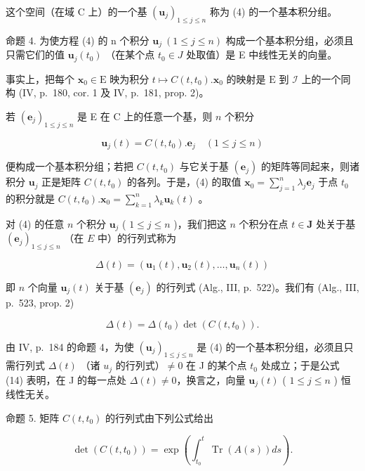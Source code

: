 这个空间（在域 C 上）的一个基 \((\mathbf{u}_{j})_{1\leqslant j\leqslant n}\) 称为 (4) 的一个基本积分组。

命题 4. 为使方程 (4) 的 n 个积分 \(\mathbf{u}_{j}\ (1 \leqslant j \leqslant n)\) 构成一个基本积分组，必须且只需它们的值 \(\mathbf{u}_{j}(t_{0})\) （在某个点 \(t_{0} \in J\) 处取值）是 E 中线性无关的向量。

事实上，把每个 \(\mathbf{x}_0 \in \mathrm{E}\) 映为积分 \(t \mapsto C(t, t_0). \mathbf{x}_0\) 的映射是 \(\mathrm{E}\) 到 \(\mathcal{I}\) 上的一个同构 (IV, p.~180, cor. 1 及 IV, p.~181, prop. 2)。

若 \(\left(\mathbf{e}_j\right)_{1\leqslant j\leqslant n}\) 是 E 在 C 上的任意一个基，则 \(n\) 个积分

\[
\mathbf {u} _ {j} (t) = C \left(t, t _ {0}\right). \mathbf {e} _ {j} \quad (1 \leqslant j \leqslant n)
\]

便构成一个基本积分组；若把 \(C(t, t_0)\) 与它关于基 \((\mathbf{e}_j)\) 的矩阵等同起来，则诸积分 \(\mathbf{u}_j\) 正是矩阵 \(C(t, t_0)\) 的各列。于是，(4) 的取值 \(\mathbf{x}_0 = \sum_{j=1}^{n} \lambda_j \mathbf{e}_j\) 于点 \(t_0\) 的积分就是 \(C(t, t_0). \mathbf{x}_0 = \sum_{k=1}^{n} \lambda_k \mathbf{u}_k(t)\) 。

对 (4) 的任意 \(n\) 个积分 \(\mathbf{u}_j\) ( \(1 \leqslant j \leqslant n\) )，我们把这 \(n\) 个积分在点 \(t \in \mathbf{J}\) 处关于基 \((\mathbf{e}_j)_{1 \leqslant j \leqslant n}\) （在 \(E\) 中）的行列式称为

\[
\Delta (t) = \left(\mathbf {u} _ {1} (t), \mathbf {u} _ {2} (t), \dots , \mathbf {u} _ {n} (t)\right)\tag{13}
\]

即 \(n\) 个向量 \(\mathbf{u}_j(t)\) 关于基 \((\mathbf{e}_j)\) 的行列式 (Alg., III, p.~522)。我们有 (Alg., III, p.~523, prop. 2)

\[
\Delta (t) = \Delta (t _ {0}) \det \left(C (t, t _ {0})\right).\tag{14}
\]

由 IV, p.~184 的命题 4，为使 \(\left(\mathbf{u}_{j}\right)_{1\leqslant j\leqslant n}\) 是 (4) 的一个基本积分组，必须且只需行列式 \(\Delta(t)\) （诸 \(u_{j}\) 的行列式）\(\neq0\) 在 J 的某个点 \(t_{0}\) 处成立；于是公式 (14) 表明，在 J 的每一点处 \(\Delta(t)\neq0\)，换言之，向量 \(\mathbf{u}_{j}(t)\) ( \(1\leqslant j\leqslant n\) ) 恒线性无关。

命题 5. 矩阵 \(C(t, t_{0})\) 的行列式由下列公式给出

\[
\det \left(C (t, t _ {0})\right) = \exp \left(\int_ {t _ {0}} ^ {t} \operatorname{Tr} (A (s)) d s\right).\tag{15}
\]


